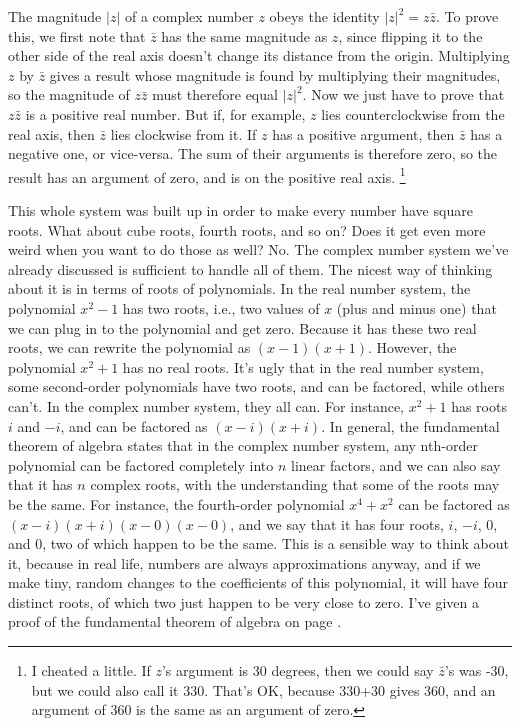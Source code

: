 \begin{eg}
The magnitude $|z|$ of a complex number $z$ obeys
the identity $|z|^2=z\bar{z}$. To prove this, we first note that $\bar{z}$
has the same magnitude as $z$, since flipping it to the other side of the
real axis doesn't change its distance from the origin. Multiplying $z$ by
$\bar{z}$ gives a result whose magnitude is found by multiplying their
magnitudes, so the magnitude of
$z\bar{z}$ must therefore equal  $|z|^2$. Now we just have to prove that
$z\bar{z}$ is a positive real number. But if, for example, $z$ lies counterclockwise
from the real axis, then $\bar{z}$ lies clockwise from it. If $z$ has a positive
argument, then $\bar{z}$ has a negative one, or vice-versa. The sum of their arguments is therefore
zero, so the result has an argument of zero, and is on the positive real axis.
\footnote{I cheated a little. If $z$'s argument
is 30 degrees, then we could say $\bar{z}$'s was -30, but we could also call it
330. That's OK, because 330+30 gives 360, and an argument of
360 is the same as an argument of zero.}
\end{eg}

This whole system was built up in order to make every number have square roots.
What about cube roots, fourth roots, and so on? Does it get even more weird when
you want to do those as well? No. The complex number system we've already discussed
is sufficient to handle all of them. The nicest way of thinking about it is in terms
of roots of polynomials. In the real number system, the polynomial $x^2-1$ has
two roots, i.e., two values of $x$ (plus and minus one) that we can plug in to the
polynomial and get zero. Because it has these two real roots, we can rewrite the
polynomial as $(x-1)(x+1)$. However, the polynomial $x^2+1$ has no real roots. It's
ugly that in the real number system, some second-order polynomials have two
roots, and can be factored, while others can't. In the complex number system,
they all can. For instance, $x^2+1$ has roots $i$ and $-i$, and can be factored
as $(x-i)(x+i)$. In general, the fundamental theorem of algebra
states that in the complex number system,
any nth-order polynomial can be factored completely
into $n$ linear factors, and we can also say that it has $n$ complex roots,
with the understanding that some of the roots may be the same. For instance,
the fourth-order polynomial $x^4+x^2$ can be factored as $(x-i)(x+i)(x-0)(x-0)$,
and we say that it has four roots, $i$, $-i$, 0, and 0, two of which happen to be
the same. This is a sensible way to think about it, because in real life, numbers are
always approximations anyway, and if we make tiny, random changes
to the coefficients of this polynomial,
it will have four distinct roots, of which two just happen to be very close
to zero. I've given a proof of the fundamental theorem of algebra on
page \pageref{detour:fn-thm-alg-proof}.

